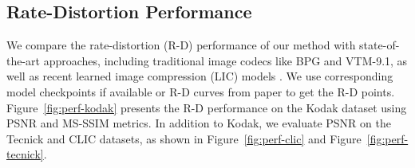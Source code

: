 \subsection{Rate-Distortion Performance}


We compare the rate-distortion (R-D) performance of our method with state-of-the-art approaches, including traditional image codecs like BPG and VTM-9.1, as well as recent learned image compression (LIC) models \cite{Balle.2018.Hyperprior, Cheng.2020.LIC, He.2022.ELIC, Liu.2023.TCM, Li.2023.FAT, Jiang.2023.MLICpp}. We use corresponding model checkpoints if available or R-D curves from paper to get the R-D points. Figure~\ref{fig:perf-kodak} presents the R-D performance on the Kodak dataset using PSNR and MS-SSIM metrics. In addition to Kodak, we evaluate PSNR on the Tecnick and CLIC datasets, as shown in Figure~\ref{fig:perf-clic} and Figure~\ref{fig:perf-tecnick}.


